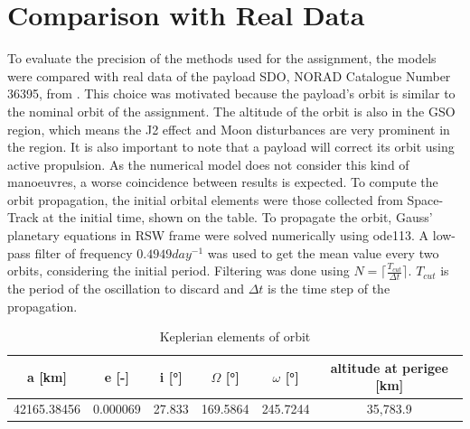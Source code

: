 \section{Comparison with Real Data}
\label{sec:comparison}

To evaluate the precision of the methods used for the assignment, the models were compared with real data of the payload SDO, NORAD Catalogue Number 36395, from \cite{space_track} \cite{n2yo}. This choice was motivated because the payload’s orbit is similar to the nominal orbit of the assignment. The altitude of the orbit is also in the GSO region, which means the J2 effect and Moon disturbances are very prominent in the region. It is also important to note that a payload will correct its orbit using active propulsion. As the numerical model does not consider this kind of manoeuvres, a worse coincidence between results is expected. To compute the orbit propagation, the initial orbital elements were those collected from Space-Track at the initial time, shown on the table. To propagate the orbit, Gauss’ planetary equations in RSW frame were solved numerically using ode113. A low-pass filter of frequency $0.4949  day^{-1}$ was used to get the mean value every two orbits, considering the initial period. Filtering was done using \( N = \lceil \frac{T_{cut}}{\Delta t} \rceil \). \( T_{cut} \) is the period of the oscillation to discard and \( \Delta t \) is the time step of the propagation. 


\begin{table}[ht]
	\centering
	\caption{Keplerian elements of orbit}
	\label{tab:keplerian_elements}
	\begin{tabular}{|c|c|c|c|c|c|}
		\hline
		a [km] & e [-] & i [°] & $\Omega$ [°] & $\omega$ [°] & altitude at perigee [km] \\
		\hline
		42165.38456 & 0.000069 & 27.833 & 169.5864 & 245.7244 & 35,783.9 \\
		\hline
	\end{tabular}
\end{table}


\newcommand{\n}{0.7}

